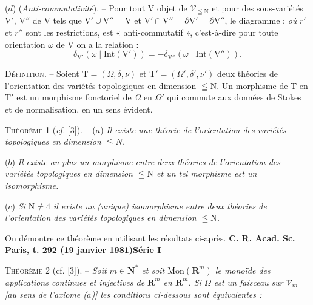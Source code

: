 ($d$) (\textit{Anti-commutativité}). -- Pour tout $\mathrm V$ objet de $\mathcal V_{\leqq\mathrm N}$ et pour des sous-variétés $\mathrm V'$, $\mathrm V''$ de $\mathrm V$ tels que $\mathrm V'\cup\mathrm V''=\mathrm V$ et $\mathrm V'\cap\mathrm V''=\partial\mathrm V'=\partial\mathrm V''$, le diagramme :
\textit{où} $r'$ et $r''$ sont les restrictions, est « anti-commutatif », c'est-à-dire pour toute orientation $\omega$ de $\mathrm V$ on a la relation :
\[
\delta_{\mathrm V'}(\omega\mid\mathrm{Int}(\mathrm V'))=-\delta_{\mathrm V''}(\omega\mid\mathrm{Int}(\mathrm V'')).
\]

\textsc{Définition}. -- Soient $\mathrm T=(\Omega,\delta,\nu)$ et $\mathrm T'=(\Omega',\delta',\nu')$ deux théories de l'orientation des variétés topologiques en dimension $\leqq\mathrm N$. Un morphisme de $\mathrm T$ en $\mathrm T'$ est un morphisme fonctoriel de $\Omega$ en $\Omega'$ qui commute aux données de Stokes et de normalisation, en un sens évident.

\textsc{Théorème} 1 (\textit{cf.} [3]). -- ($a$) \textit{Il existe une théorie de l'orientation des variétés topologiques en dimension $\leqq N$.}

($b$) \textit{Il existe au plus \textup{un morphisme} entre deux théories de l'orientation des variétés topologiques en dimension $\leqq\mathrm N$ et un tel morphisme est un \textup{isomorphisme}.}

($c$) \textit{Si $\mathrm N\ne4$ il existe un \textup{(unique)} isomorphisme entre deux théories de l'orientation des variétés topologiques en dimension $\leqq\mathrm N$.}

On démontre ce théorème en utilisant les résultats ci-après.
\textbf{C. R. Acad. Sc. Paris, t. 292 (19 janvier 1981)}\hfill\textbf{Série I -- }

\textsc{Théorème} 2 (cf. [3]). -- \textit{Soit $m\in\mathbf N^*$ et soit $\mathrm{Mon}(\mathbf R^m)$ le monoïde des applications continues et injectives de $\mathbf R^m$ en $\mathbf R^m$. Si $\Omega$ est un faisceau sur $\mathcal V_m$ [au sens de l'axiome ($a$)] les conditions ci-dessous sont équivalentes :}

